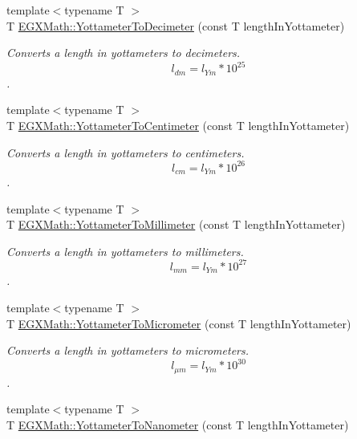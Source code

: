 \begin{DoxyCompactItemize}
{\footnotesize template$<$typename T $>$ }\\T \mbox{\hyperlink{group___e_g_x_math-_conversions-_length_conversions-_s_i-_yottameter-_s_i_ga8d80b66500f1ccc85839ec50b0ca8b0d}{E\+G\+X\+Math\+::\+Yottameter\+To\+Decimeter}} (const T length\+In\+Yottameter)
\begin{DoxyCompactList}\small\item\em Converts a length in yottameters to decimeters. \[ l_{dm}=l_{Ym} * 10^{25} \]. \end{DoxyCompactList}\item 
{\footnotesize template$<$typename T $>$ }\\T \mbox{\hyperlink{group___e_g_x_math-_conversions-_length_conversions-_s_i-_yottameter-_s_i_ga29b512ac5c39f960b5f705cfb9bfe226}{E\+G\+X\+Math\+::\+Yottameter\+To\+Centimeter}} (const T length\+In\+Yottameter)
\begin{DoxyCompactList}\small\item\em Converts a length in yottameters to centimeters. \[ l_{cm}=l_{Ym} * 10^{26} \]. \end{DoxyCompactList}\item 
{\footnotesize template$<$typename T $>$ }\\T \mbox{\hyperlink{group___e_g_x_math-_conversions-_length_conversions-_s_i-_yottameter-_s_i_ga0e68b787003f09883a6b15b92b003a07}{E\+G\+X\+Math\+::\+Yottameter\+To\+Millimeter}} (const T length\+In\+Yottameter)
\begin{DoxyCompactList}\small\item\em Converts a length in yottameters to millimeters. \[ l_{mm}=l_{Ym} * 10^{27} \]. \end{DoxyCompactList}\item 
{\footnotesize template$<$typename T $>$ }\\T \mbox{\hyperlink{group___e_g_x_math-_conversions-_length_conversions-_s_i-_yottameter-_s_i_ga25310d8ba2830f305680927ac3c13c38}{E\+G\+X\+Math\+::\+Yottameter\+To\+Micrometer}} (const T length\+In\+Yottameter)
\begin{DoxyCompactList}\small\item\em Converts a length in yottameters to micrometers. \[ l_{\mu m}=l_{Ym} * 10^{30} \]. \end{DoxyCompactList}\item 
{\footnotesize template$<$typename T $>$ }\\T \mbox{\hyperlink{group___e_g_x_math-_conversions-_length_conversions-_s_i-_yottameter-_s_i_ga9e117a640ecd0bea911edac05c685c31}{E\+G\+X\+Math\+::\+Yottameter\+To\+Nanometer}} (const T length\+In\+Yottameter)

\end{DoxyCompactItemize}
